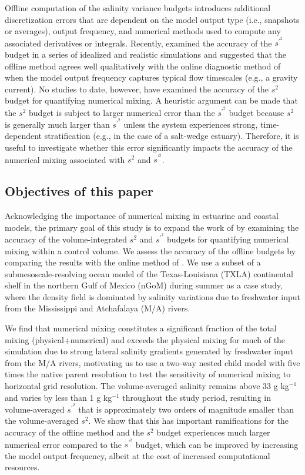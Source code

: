 \documentclass[draft]{agujournal2019}
\begin{document}
Offline computation of the salinity variance budgets introduces additional discretization errors that are dependent on the model output type (i.e., snapshots or averages), output frequency, and numerical methods used to compute any associated derivatives or integrals. Recently,  examined the accuracy of the $s^{\prime^2}$ budget in a series of idealized and realistic simulations and suggested that the offline method agrees well qualitatively with the online diagnostic method of  when the model output frequency captures typical flow timescales (e.g., a gravity current). No studies to date, however, have examined the accuracy of the $s^2$ budget for quantifying numerical mixing. A heuristic argument can be made that the $s^2$ budget is subject to larger numerical error than the $s^{\prime^2}$ budget because $s^2$ is generally much larger than $s^{\prime^2}$ unless the system experiences strong, time-dependent stratification (e.g., in the case of a salt-wedge estuary). Therefore, it is useful to investigate whether this error significantly impacts the accuracy of the numerical mixing associated with $s^2$ and $s^{\prime^2}$. 

\subsection{Objectives of this paper}

Acknowledging the importance of numerical mixing in estuarine and coastal models, the primary goal of this study is to expand the work of  by examining the accuracy of the volume-integrated $s^2$ and $s^{\prime^2}$ budgets for quantifying numerical mixing within a control volume. We assess the accuracy of the offline budgets by comparing the results with the online method of . We use a subset of a submesoscale-resolving ocean model of the Texas-Louisiana (TXLA) continental shelf in the northern Gulf of Mexico (nGoM) during summer as a case study, where the density field is dominated by salinity variations due to freshwater input from the Mississippi and Atchafalaya (M/A) rivers.

We find that numerical mixing constitutes a significant fraction of the total mixing (physical+numerical) and exceeds the physical mixing for much of the simulation due to strong lateral salinity gradients generated by freshwater input from the M/A rivers, motivating us to use a two-way nested child model with five times the native parent resolution to test the sensitivity of numerical mixing to horizontal grid resolution. The volume-averaged salinity remains above 33 g kg$^{-1}$ and varies by less than 1 g kg$^{-1}$ throughout the study period, resulting in volume-averaged $s^{\prime^2}$ that is approximately two orders of magnitude smaller than the volume-averaged $s^2$. We show that this has important ramifications for the accuracy of the offline method and the $s^2$ budget experiences much larger numerical error compared to the $s^{\prime^2}$ budget, which can be improved by increasing the model output frequency, albeit at the cost of increased computational resources. 
\end{document}
